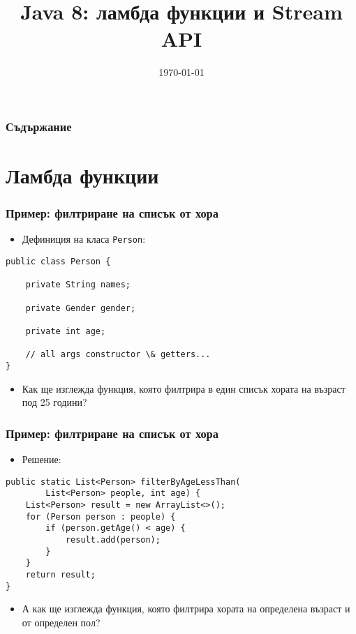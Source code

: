 \documentclass[ignorenonframetext, hyperref=unicode,compress,pdflatex]{beamer}
\title{Java 8: ламбда функции и Stream API}
\date{\today}
\begin{document}
\frame{\titlepage}


\begin{frame}
\frametitle{Съдържание}
\tableofcontents %
\end{frame}


\section{Ламбда функции}

\begin{frame}[containsverbatim]\frametitle{Пример: филтриране на списък от хора}
\begin{itemize}
\item Дефиниция на класа \lstinline{Person}:
\end{itemize}
\begin{lstlisting}
public class Person {

	private String names;

	private Gender gender;

	private int age;

    // all args constructor \& getters...
}
\end{lstlisting}
\begin{itemize}
\item Как ще изглежда функция, която филтрира в един списък хората на възраст
под 25 години?
\end{itemize}
\end{frame}


\begin{frame}[containsverbatim]\frametitle{Пример: филтриране на списък от хора}
\begin{itemize}
\item Решение:
\end{itemize}
\begin{lstlisting}
public static List<Person> filterByAgeLessThan(
		List<Person> people, int age) {
	List<Person> result = new ArrayList<>();
	for (Person person : people) {
		if (person.getAge() < age) {
			result.add(person);
		}
	}
	return result;
}
\end{lstlisting}
\begin{itemize}
\item А как ще изглежда функция, която филтрира хората на определена възраст и
от определен пол?
\end{itemize}
\end{frame}
\end{document}

